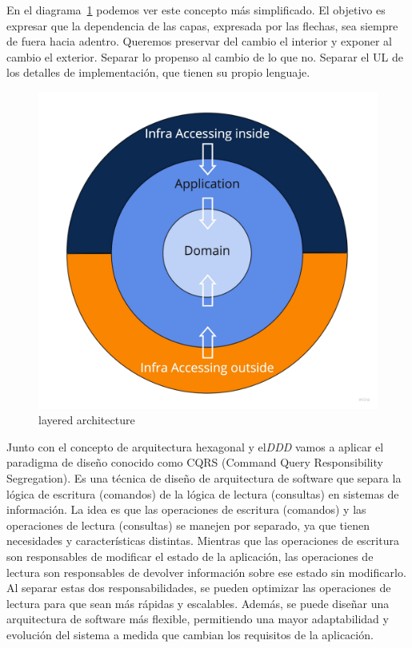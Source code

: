 En el diagrama~\cref{fig:layers} podemos ver este concepto más simplificado. El objetivo es expresar que la dependencia de las capas, expresada por las flechas, sea siempre de fuera hacia adentro. Queremos preservar del cambio el interior y exponer al cambio el exterior. Separar lo propenso al cambio de lo que no. Separar el UL de los detalles de implementación, que tienen su propio lenguaje.

\begin{figure}[H]
    \centering
    \includegraphics[height=0.3\textheight]{./part/Proyecto_ejecutivo/memoria_descriptiva/infoPreviaAntecedentes/img/PFM - Layer}
    \caption{layered architecture}\label{fig:layers}
\end{figure}

Junto con el concepto de arquitectura hexagonal y el\textit{DDD} vamos a aplicar el paradigma de diseño conocido como \gls{CQRS} (Command Query Responsibility Segregation). Es una técnica de diseño de arquitectura de software que separa la lógica de escritura (comandos) de la lógica de lectura (consultas) en sistemas de información. La idea es que las operaciones de escritura (comandos) y las operaciones de lectura (consultas) se manejen por separado, ya que tienen necesidades y características distintas. Mientras que las operaciones de escritura son responsables de modificar el estado de la aplicación, las operaciones de lectura son responsables de devolver información sobre ese estado sin modificarlo. Al separar estas dos responsabilidades, se pueden optimizar las operaciones de lectura para que sean más rápidas y escalables. Además, se puede diseñar una arquitectura de software más flexible, permitiendo una mayor adaptabilidad y evolución del sistema a medida que cambian los requisitos de la aplicación.

